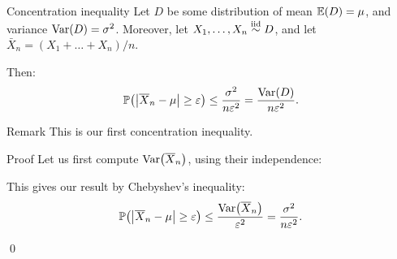 \documentclass[a4paper]{article}
\begin{document}
\begin{parag}{Concentration inequality}
    Let $D$ be some distribution of mean $\exval\left(D\right) = \mu$, and variance $\Var\left(D\right) = \sigma^2$. Moreover, let $X_1, \ldots, X_n \overset{\text{iid}}{\sim} D$, and let $\bar{X}_n = \left(X_1 + \ldots + X_n\right)/n$.

    Then: 
    \[\prob\left(\left|\bar{X}_n - \mu\right| \geq \epsilon\right) \leq \frac{\sigma^2}{n \epsilon^2} = \frac{\Var\left(D\right)}{n \epsilon^2}.\]

    \begin{subparag}{Remark}
        This is our first concentration inequality.
    \end{subparag}

    \begin{subparag}{Proof}
        Let us first compute $\Var\left(\bar{X}_n\right)$, using their independence: 

        This gives our result by Chebyshev's inequality: 
        \[\prob\left(\left|\bar{X}_n - \mu\right| \geq \epsilon\right) \leq \frac{\Var\left(\bar{X}_n\right)}{\epsilon^2} = \frac{\sigma^2}{n \epsilon^2}.\]

        \qed
    \end{subparag}
\end{parag}
\end{document}
